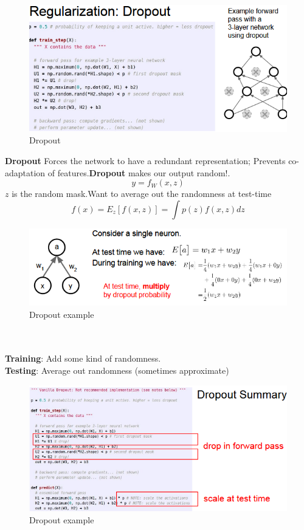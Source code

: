 \documentclass[11pt]{article}
\begin{document}
\begin{figure}[h]
\centering
\captionsetup{justification=centering}
\includegraphics[width=0.8\linewidth]{L622.pdf}
\caption{ Dropout}
\label{fig:L622}
\end{figure}
\textbf{Dropout} Forces the network to have a redundant representation; Prevents co-adaptation of features.\textbf{Dropout} makes our output random!.
\begin{equation}
    y = f_W(x,z)
\end{equation}{}
$z$ is the random mask.Want to average out the randomness at test-time
\begin{equation}
    f(x) =E_z[f(x,z)]=\int p(z)f(x,z)dz
\end{equation}{}
\begin{figure}[h]
\centering
\captionsetup{justification=centering}
\includegraphics[width=0.8\linewidth]{L623.pdf}
\caption{ Dropout example}
\label{fig:L623}
\end{figure}\\\\
\textbf{Training}: Add some kind of randomness.\\
\textbf{Testing}: Average out randomness (sometimes approximate)
\clearpage
\begin{figure}[h]
\centering
\captionsetup{justification=centering}
\includegraphics[width=1\linewidth]{L624.pdf}
\caption{ Dropout example}
\label{fig:L624}
\end{figure}
\end{document}
